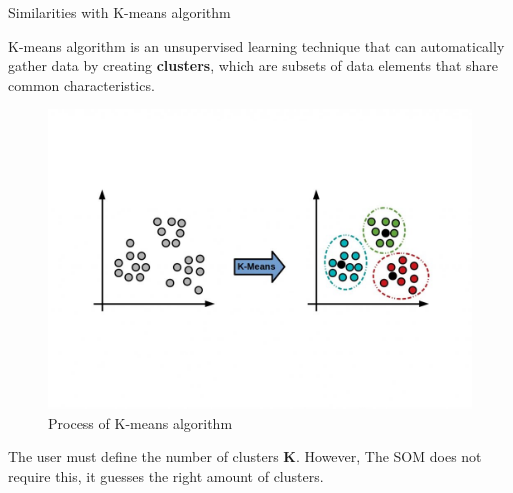 \documentclass{beamer}
\begin{document}
	
	\begin{frame}{Similarities with K-means algorithm}
		
		K-means algorithm is an unsupervised learning technique that can automatically gather data by creating \textbf{clusters}, which are subsets of data elements that share common characteristics.

		\begin{center}
			
			\begin{figure}[h]
			
				\includegraphics[width=0.6\linewidth]{pics/kmeans.jpeg}
				\caption{Process of K-means algorithm}
			\end{figure}
		\end{center}
				
		The user must define the number of clusters \textbf{K}. However, The SOM does not require this, it guesses the right amount of clusters.

	\end{frame}
\end{document}
